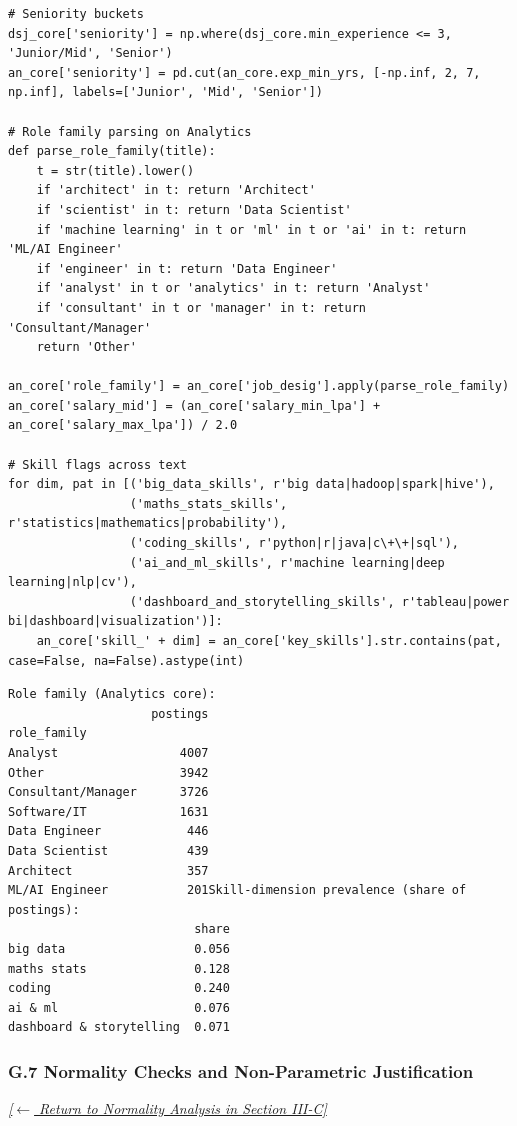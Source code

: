 \documentclass[conference]{IEEEtran}
\begin{document}
\begin{lstlisting}[style=pythonstyle,caption={Constructing shared role families, seniority buckets, and skill dimensions.},label={lst:features_code}]
# Seniority buckets
dsj_core['seniority'] = np.where(dsj_core.min_experience <= 3, 'Junior/Mid', 'Senior')
an_core['seniority'] = pd.cut(an_core.exp_min_yrs, [-np.inf, 2, 7, np.inf], labels=['Junior', 'Mid', 'Senior'])

# Role family parsing on Analytics
def parse_role_family(title):
    t = str(title).lower()
    if 'architect' in t: return 'Architect'
    if 'scientist' in t: return 'Data Scientist'
    if 'machine learning' in t or 'ml' in t or 'ai' in t: return 'ML/AI Engineer'
    if 'engineer' in t: return 'Data Engineer'
    if 'analyst' in t or 'analytics' in t: return 'Analyst'
    if 'consultant' in t or 'manager' in t: return 'Consultant/Manager'
    return 'Other'

an_core['role_family'] = an_core['job_desig'].apply(parse_role_family)
an_core['salary_mid'] = (an_core['salary_min_lpa'] + an_core['salary_max_lpa']) / 2.0

# Skill flags across text
for dim, pat in [('big_data_skills', r'big data|hadoop|spark|hive'),
                 ('maths_stats_skills', r'statistics|mathematics|probability'),
                 ('coding_skills', r'python|r|java|c\+\+|sql'),
                 ('ai_and_ml_skills', r'machine learning|deep learning|nlp|cv'),
                 ('dashboard_and_storytelling_skills', r'tableau|power bi|dashboard|visualization')]:
    an_core['skill_' + dim] = an_core['key_skills'].str.contains(pat, case=False, na=False).astype(int)
\end{lstlisting}

\begin{lstlisting}[style=outputstyle,caption={Execution Output G.6: Derived Feature Value Counts.},label={out:features}]
Role family (Analytics core):
                    postings
role_family                 
Analyst                 4007
Other                   3942
Consultant/Manager      3726
Software/IT             1631
Data Engineer            446
Data Scientist           439
Architect                357
ML/AI Engineer           201Skill-dimension prevalence (share of postings):
                          share
big data                  0.056
maths stats               0.128
coding                    0.240
ai & ml                   0.076
dashboard & storytelling  0.071
\end{lstlisting}

\subsubsection*{G.7 Normality Checks and Non-Parametric Justification}
\label{lst:normality}
\textit{\hyperref[sec:normality]{[$\leftarrow$ Return to Normality Analysis in Section III-C]}}
\end{document}
